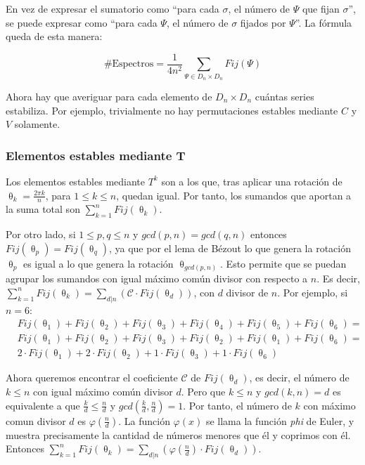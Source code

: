 		En vez de expresar el sumatorio como ``para cada $\sigma$, el n\'umero de $\Psi$ que fijan $\sigma$'', se puede expresar como ``para cada $\Psi$, el n\'umero de $\sigma$ fijados por $\Psi$''. La f\'ormula queda de esta manera:
		
		\[\#\mbox{Espectros}=\frac{1}{4n^2}\sum_{\Psi\in{D}_{n}\times{D}_{n}}{Fij}(\Psi)\] 
		
		Ahora hay que averiguar para cada elemento de ${D}_{n}\times{D}_{n}$ cu\'antas series estabiliza. Por ejemplo, trivialmente no hay permutaciones estables mediante $C$ y $V$ solamente.
		
		
		\subsubsection[Elementos estables mediante $T$]{Elementos estables mediante $\bm{T}$}
		
		Los elementos estables mediante $T^{k}$ son a los que, tras aplicar una rotaci\'on de $\uptheta_{k}=\frac{2\pi k}{n}$, para $1\leq k\leq n$, quedan igual. Por tanto, los sumandos que aportan a la suma total son $\sum\limits_{k=1}^{n}{Fij}(\uptheta_{k})$.
		
		Por otro lado, si $1\leq p,q\leq n$ y $gcd(p,n)=gcd(q,n)$ entonces ${Fij}(\uptheta_p)={Fij}(\uptheta_q)$, ya que por el lema de B\'ezout lo que genera la rotaci\'on $\uptheta_p$ es igual a lo que genera la rotaci\'on $\uptheta_{{gcd}(p,n)}$. Esto permite que se puedan agrupar los sumandos con igual m\'aximo com\'un divisor con respecto a $n$. Es decir, $\sum\limits_{k=1}^{n}{Fij}(\uptheta_{k})=\sum\limits_{d|n}\left(\mathcal{C}\cdot{Fij}(\uptheta_d)\right)$, con $d$ divisor de $n$.
		Por ejemplo, si $n=6$:
		\begin{align*}
			&{Fij}(\uptheta_{1})+{Fij}(\uptheta_{2})+{Fij}(\uptheta_{3})+{Fij}(\uptheta_{4})+{Fij}(\uptheta_{5})+{Fij}(\uptheta_{6})=\\
			&{Fij}(\uptheta_{1})+{Fij}(\uptheta_{2})+{Fij}(\uptheta_{3})+{Fij}(\uptheta_{2})+{Fij}(\uptheta_{1})+{Fij}(\uptheta_{6})=\\
			&2\cdot{Fij}(\uptheta_{1})+2\cdot{Fij}(\uptheta_{2})+1\cdot{Fij}(\uptheta_{3})+1\cdot{Fij}(\uptheta_{6})
		\end{align*}
		
		
		Ahora queremos encontrar el coeficiente $\mathcal{C}$ de ${Fij}(\uptheta_d)$, es decir, el n\'umero de $k\leq n$ con igual m\'aximo com\'un divisor $d$. Pero que $k\leq n$ y $gcd(k,n)=d$ es equivalente a que $ \frac{k}{d}\leq\frac{n}{d}$ y $gcd\left(\frac{k}{d},\frac{n}{d}\right)=1$. Por tanto, el n\'umero de $k$ con m\'aximo comun divisor $d$ es $\varphi\left(\frac{n}{d}\right)$. La funci\'on $\varphi(x)$ se llama la funci\'on \textit{phi} de Euler, y muestra precisamente la cantidad de n\'umeros menores que \'el y coprimos con \'el. Entonces $\sum\limits_{{k}=1}^{n}{Fij}(\uptheta_{{k}})=\sum\limits_{d|n}\left(\varphi(\frac{n}{d})\cdot{Fij}(\uptheta_d)\right)$.
		
